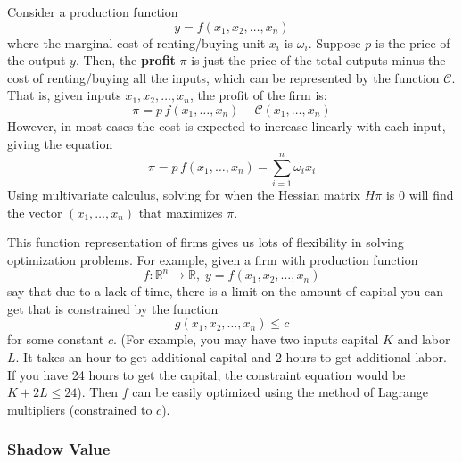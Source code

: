 \documentclass{article}
\begin{document}
    \begin{definition}[Profit]
      \label{def:profit}
      Consider a production function 
      \begin{equation}
        y = f(x_1, x_2, \ldots, x_n)
      \end{equation}
      where the marginal cost of renting/buying unit $x_i$ is $\omega_i$. Suppose $p$ is the price of the output $y$. Then, the \textbf{profit} $\pi$ is just the price of the total outputs minus the cost of renting/buying all the inputs, which can be represented by the function $\mathcal{C}$. That is, given inputs $x_1, x_2, \ldots, x_n$, the profit of the firm is:
      \begin{equation}
        \pi = p \, f(x_1, \ldots, x_n) - \mathcal{C}(x_1, \ldots, x_n)
      \end{equation}
      However, in most cases the cost is expected to increase linearly with each input, giving the equation
      \begin{equation}
        \pi = p \, f(x_1, \ldots, x_n) - \sum_{i=1}^n \omega_i x_i
      \end{equation}
      Using multivariate calculus, solving for when the Hessian matrix $H \pi$ is $0$ will find the vector $(x_1, \ldots, x_n)$ that maximizes $\pi$. 
    \end{definition}

    This function representation of firms gives us lots of flexibility in solving optimization problems. For example, given a firm with production function 
    \begin{equation}
      f: \mathbb{R}^n \to \mathbb{R}, \; y = f(x_1, x_2, \ldots, x_n)
    \end{equation}
    say that due to a lack of time, there is a limit on the amount of capital you can get that is constrained by the function 
    \begin{equation}
      g(x_1, x_2, \ldots, x_n) \leq c
    \end{equation}
    for some constant $c$. (For example, you may have two inputs capital $K$ and labor $L$. It takes an hour to get additional capital and 2 hours to get additional labor. If you have 24 hours to get the capital, the constraint equation would be $K + 2L \leq 24$). Then $f$ can be easily optimized using the method of Lagrange multipliers (constrained to $c$). 

    \subsubsection{Shadow Value}
\end{document}
